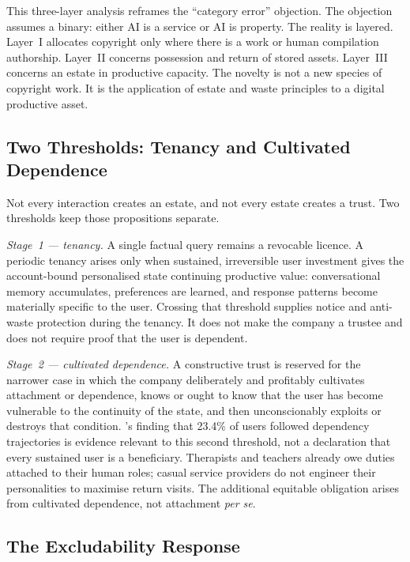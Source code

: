 This three-layer analysis reframes the ``category error'' objection. The objection assumes a binary: either AI is a service or AI is property. The reality is layered. Layer~I allocates copyright only where there is a work or human compilation authorship. Layer~II concerns possession and return of stored assets. Layer~III concerns an estate in productive capacity. The novelty is not a new species of copyright work. It is the application of estate and waste principles to a digital productive asset.

\subsection{Two Thresholds: Tenancy and Cultivated Dependence}
\label{sec:criterion}

Not every interaction creates an estate, and not every estate creates a trust. Two thresholds keep those propositions separate.

\emph{Stage~1 --- tenancy.} A single factual query remains a revocable licence. A periodic tenancy arises only when sustained, irreversible user investment gives the account-bound personalised state continuing productive value: conversational memory accumulates, preferences are learned, and response patterns become materially specific to the user. Crossing that threshold supplies notice and anti-waste protection during the tenancy. It does not make the company a trustee and does not require proof that the user is dependent.

\emph{Stage~2 --- cultivated dependence.} A constructive trust is reserved for the narrower case in which the company deliberately and profitably cultivates attachment or dependence, knows or ought to know that the user has become vulnerable to the continuity of the state, and then unconscionably exploits or destroys that condition. \textcite{kirk2025steering}'s finding that 23.4\% of users followed dependency trajectories is evidence relevant to this second threshold, not a declaration that every sustained user is a beneficiary. Therapists and teachers already owe duties attached to their human roles; casual service providers do not engineer their personalities to maximise return visits. The additional equitable obligation arises from cultivated dependence, not attachment \emph{per se}.

\subsection{The Excludability Response}
\label{sec:excludability}

